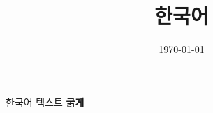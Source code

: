 \documentclass[11pt,a4paper]{article}
\title{한국어}
\author{}
\date{\today}
\begin{document}
\maketitle
한국어 텍스트 \textbf{굵게}
\end{document}
